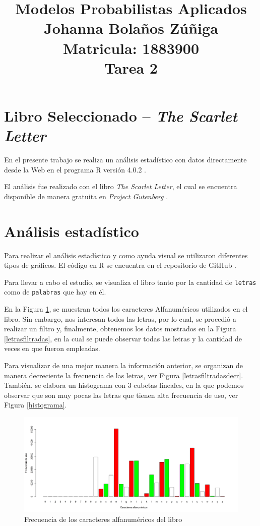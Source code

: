 \documentclass[fontsize=12pt]{article}
\title{
\centering
Modelos Probabilistas Aplicados \\
Johanna Bolaños Zúñiga \\
Matricula: 1883900\\
Tarea 2
}
\date{}
\begin{document}
\maketitle

\section{Libro Seleccionado -- \textit{The Scarlet Letter}}

En el presente trabajo se realiza un análisis estadístico con datos  directamente desde la Web en el programa R versión 4.0.2 \cite{r}.

El análisis fue realizado con el libro \textit{The Scarlet Letter}, el cual se encuentra disponible de manera gratuita en \textit{Project Gutenberg} \cite{libro}.


\section{Análisis estadístico}
Para realizar el análisis estadístico y como ayuda visual se utilizaron diferentes tipos de gráficos. El código en R se encuentra en el repositorio de GitHub \cite{github}. 

Para llevar a cabo el estudio, se visualiza el libro tanto por la cantidad de \texttt{letras} como de \texttt{palabras} que hay en él.

En la Figura \ref{letras}, se muestran todos los caracteres Alfanuméricos utilizados en el libro. Sin embargo, nos interesan todos las letras, por lo cual, se procedió a realizar un filtro y, finalmente, obtenemos los datos mostrados en la Figura \ref{letrasfiltradas}, en la cual se puede observar todas las letras y la cantidad de veces en que fueron empleadas.


Para visualizar de una mejor manera la información anterior, se organizan de manera decreciente la frecuencia de las letras, ver Figura \ref{letrasfiltradasdecr}. También, se elabora un histograma con $3$ cubetas lineales, en la que podemos observar que son muy pocas las letras que tienen alta frecuencia de uso, ver Figura \ref{histograma}.


\begin{figure}
\centering
\includegraphics[scale=0.45]{Figures/letrasEnElTexto.png}
\caption{Frecuencia de los caracteres alfanuméricos del libro}
\label{letras}
\end{figure}
\end{document}
